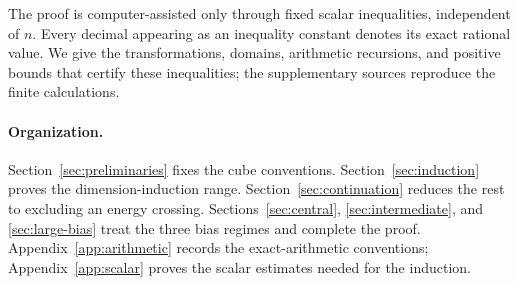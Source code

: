 \documentclass[11pt]{article}
\numberwithin{equation}{section}
\theoremstyle{definition}
\theoremstyle{remark}
\begin{document}
The proof is computer-assisted only through fixed scalar inequalities, independent of \(n\). Every decimal appearing as an inequality constant denotes its exact rational value. We give the transformations, domains, arithmetic recursions, and positive bounds that certify these inequalities; the supplementary sources reproduce the finite calculations.



\paragraph{Organization.}
Section~\ref{sec:preliminaries} fixes the cube conventions.
Section~\ref{sec:induction} proves the dimension-induction range.
Section~\ref{sec:continuation} reduces the rest to excluding an energy crossing.
Sections~\ref{sec:central}, \ref{sec:intermediate}, and \ref{sec:large-bias}
treat the three bias regimes and complete the proof.
Appendix~\ref{app:arithmetic} records the exact-arithmetic conventions;
Appendix~\ref{app:scalar} proves the scalar estimates needed for the induction.








\appendix



\end{document}
